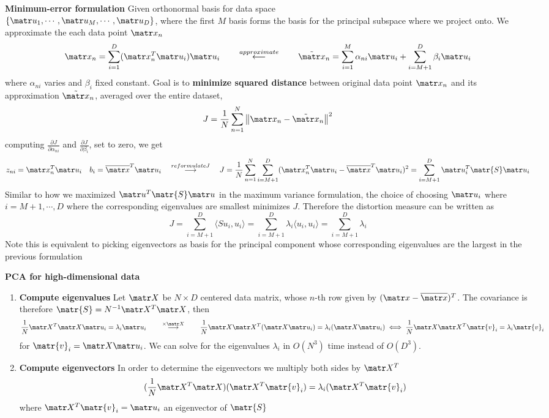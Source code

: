 \documentclass[11pt]{article}
\begin{document}
\begin{defn*}
    \textbf{Minimum-error formulation} Given orthonormal basis for data space \\ 
    $\{\bu_1, \cdots,\bu_M, \cdots, \bu_D\}$, where the first $M$ basis forms the basis for the principal subspace where we project onto. We approximate the each data point $\bx_n$
    \[
        \bx_n = \sum_{i=1}^D (\bx_n^T \bu_i) \bu_i
        \qquad 
        \overset{approximate}{\longleftarrow}
        \qquad 
        \tilde{\bx}_n = \sum_{i=1}^M \alpha_{ni} \bu_i + \sum_{i=M+1}^D \beta_i \bu_i
    \]
    where $\alpha_{ni}$ varies and $\beta_i$ fixed constant. Goal is to \textbf{minimize squared distance} between original data point $\bx_n$ and its approximation $\tilde{\bx}_n$, averaged over the entire dataset, 
    \[
        J = \frac{1}{N} \sum_{n=1}^N \norm{\bx_n - \tilde{\bx}_n}^2
    \]
    computing $\textstyle \frac{\partial J}{\partial \alpha_{ni}}$ and $\textstyle \frac{\partial J}{\partial \beta_{i}}$, set to zero, we get 
    \[
        z_{ni} = \bx_n^T \bu_i 
        \quad 
        b_{i} = \overline{\bx}^T \bu_i    
        \quad \overset{reformulate J}{\longrightarrow} \quad 
        J = \frac{1}{N} \sum_{n=1}^N \sum_{i=M+1}^D (\bx_n^T \bu_i - \overline{\bx}^T \bu_i)^2 = \sum_{i=M+1}^D \bu_i^T \matr{S} \bu_i
    \]
    Similar to how we maximized $\bu^T \matr{S} \bu$ in the maximum variance formulation, the choice of choosing $\bu_i$ where $i=M+1,\cdots, D$ where the corresponding eigenvalues are smallest minimizes $J$. Therefore the distortion measure can be written as 
    \[
        J = \sum_{i=M+1}^D \langle Su_i, u_i \rangle = \sum_{i=M+1}^D \lambda_i \langle u_i, u_i \rangle = \sum_{i=M+1}^D \lambda_i
    \]
    Note this is equivalent to picking eigenvectors as basis for the principal component whose corresponding eigenvalues are the largest in the previous formulation
\end{defn*}

\begin{defn*}
    \textbf{PCA for high-dimensional data} 
    \begin{enumerate}
        \item \textbf{Compute eigenvalues} Let $\bX$ be $N\times D$ centered data matrix, whose $n$-th row given by $(\bx - \overline{\bx})^T$. The covariance is therefore $\matr{S} = N^{-1} \bX^T \bX$, then 
        \[
            \frac{1}{N} \bX^T \bX \bu_i = \lambda_i \bu_i    
            \qquad \overset{\times \bX}{\longrightarrow} \qquad 
            \frac{1}{N} \bX \bX^T (\bX \bu_i) = \lambda_i (\bX \bu_i)
            \iff 
            \frac{1}{N} \bX \bX^T \matr{v}_i = \lambda_i \matr{v}_i 
        \]
        for $\matr{v}_i = \bX \bu_i$. We can solve for the eigenvalues $\lambda_i$ in $O(N^3)$ time instead of $O(D^3)$.
        \item \textbf{Compute eigenvectors} In order to determine the eigenvectors we multiply both sides by $\bX^T$ 
        \[
            (\frac{1}{N} \bX^T \bX) (\bX^T \matr{v}_i) = \lambda_i (\bX^T \matr{v}_i)    
        \]
        where $\bX^T \matr{v}_i = \bu_i$ an eigenvector of $\matr{S}$
    \end{enumerate}
\end{defn*} 
\end{document}
